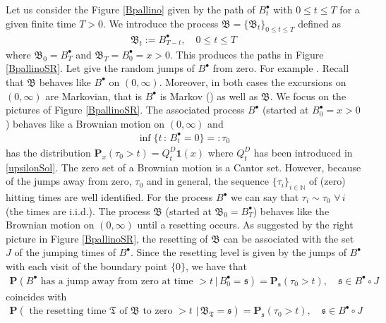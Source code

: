 \documentclass[11pt,a4paper]{article}
\theoremstyle{plain}
\theoremstyle{definition}
\theoremstyle{remark}
\begin{document}
		Let us consider the Figure \ref{Bpallino} given by the path of $B^\bullet_t$ with $0\leq t \leq T$ for a given finite time $T>0$. We introduce the process $\mathfrak{B}=\{\mathfrak{B}_t\}_{0 \leq t \leq T}$ defined as
		\begin{align*}
			\mathfrak{B}_t := B^\bullet_{T-t}, \quad 0 \leq t \leq T
		\end{align*}
		where $\mathfrak{B}_0 = B^\bullet_T$ and $\mathfrak{B}_T=B^\bullet_0 = x>0$. This produces the paths in Figure \ref{BpallinoSR}. Let  give the random jumps of $B^\bullet$ from zero. For example . Recall that $\mathfrak{B}$ behaves like $B^\bullet$ on $(0, \infty)$. Moreover, in both cases the excursions on $(0, \infty)$ are Markovian, that is $B^\bullet$ is Markov (\cite[Section 13]{ito1963brownian}) as well as $\mathfrak{B}$. We focus on the pictures of Figure \ref{BpallinoSR}. The associated process $B^\bullet$ (started at $B^\bullet_0=x>0$) behaves like a Brownian motion on $(0, \infty)$ and
		\begin{align*}
			\inf\{t \,:\, B^\bullet_t=0\} =:\tau_0
		\end{align*} 
		has the distribution $\mathbf{P}_x(\tau_0 >t) = Q^D_t \mathbf{1}(x)$ where $Q^D_t$ has been introduced in \eqref{upsilonSol}. The zero set of a Brownian motion is a Cantor set. However, because of the jumps away from zero, $\tau_0$ and in general, the sequence $\{\tau_i\}_{ i \in \mathbb{N}}$ of (zero) hitting times are well identified. For the process $B^\bullet$ we can say that $\tau_i \sim \tau_0$ $\forall\, i$ (the times are i.i.d.).  The process $\mathfrak{B}$ (started at $\mathfrak{B}_0=B^\bullet_T$) behaves like the Brownian motion on $(0, \infty)$ until a resetting occurs. As suggested by the right picture in Figure \ref{BpallinoSR}, the resetting of $\mathfrak{B}$ can be associated with the set $J$ of the jumping times of $B^\bullet$. Since the resetting level is given by the jumps of $B^\bullet$ with each visit of the boundary point $\{0\}$, we have that
		\begin{align}
			\label{Hy}
			\mathbf{P}(B^\bullet \textrm{ has a jump away from zero at time }  > t \, |\,  B^\bullet_{0} = \mathfrak{s}) = \mathbf{P}_{\mathfrak{s}}(\tau_0 >t), \quad \mathfrak{s} \in B^\bullet \circ J
		\end{align}
		coincides with
		\begin{align}
			\label{Hx}
			\mathbf{P}(\textrm{ the resetting time $\mathfrak{T}$ of $\mathfrak{B}$ to zero }  > t\, \, |\, \mathfrak{B}_\mathfrak{T}=\mathfrak{s}) = \mathbf{P}_{\mathfrak{s}}(\tau_0 >t), \quad \mathfrak{s} \in B^\bullet \circ J
		\end{align}
\end{document}
